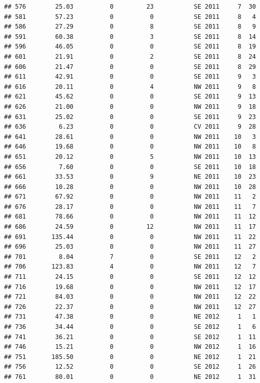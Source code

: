 \documentclass[
]{article}
\begin{document}
\begin{verbatim}
## 576        25.03          0         23           SE 2011     7  30
## 581        57.23          0          0           SE 2011     8   4
## 586        27.29          0          8           SE 2011     8   9
## 591        60.38          0          3           SE 2011     8  14
## 596        46.05          0          0           SE 2011     8  19
## 601        21.91          0          2           SE 2011     8  24
## 606        21.47          0          0           SE 2011     8  29
## 611        42.91          0          0           SE 2011     9   3
## 616        20.11          0          4           NW 2011     9   8
## 621        45.62          0          0           SE 2011     9  13
## 626        21.00          0          0           NW 2011     9  18
## 631        25.02          0          0           SE 2011     9  23
## 636         6.23          0          0           CV 2011     9  28
## 641        28.61          0          0           NW 2011    10   3
## 646        19.68          0          0           NW 2011    10   8
## 651        20.12          0          5           NW 2011    10  13
## 656         7.60          0          0           SE 2011    10  18
## 661        33.53          0          9           NE 2011    10  23
## 666        10.28          0          0           NW 2011    10  28
## 671        67.92          0          0           NW 2011    11   2
## 676        28.17          0          0           NW 2011    11   7
## 681        78.66          0          0           NW 2011    11  12
## 686        24.59          0         12           NW 2011    11  17
## 691       135.44          0          0           NW 2011    11  22
## 696        25.03          0          0           NW 2011    11  27
## 701         8.04          7          0           SE 2011    12   2
## 706       123.83          4          0           NW 2011    12   7
## 711        24.15          0          0           SE 2011    12  12
## 716        19.68          0          0           NW 2011    12  17
## 721        84.03          0          0           NW 2011    12  22
## 726        22.37          0          0           NW 2011    12  27
## 731        47.38          0          0           NE 2012     1   1
## 736        34.44          0          0           SE 2012     1   6
## 741        36.21          0          0           SE 2012     1  11
## 746        15.21          0          0           NW 2012     1  16
## 751       185.50          0          0           NE 2012     1  21
## 756        12.52          0          0           SE 2012     1  26
## 761        80.01          0          0           NE 2012     1  31

\end{verbatim}
\end{document}
